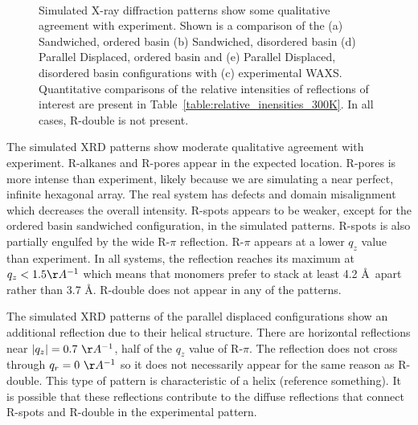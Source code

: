 \documentclass[journal=jpcbfk,manusciprt=article]{achemso}
\begin{document}
\begin{figure}[!htb]
\begin{subfigure}{0.1\textwidth}
	\end{subfigure}	
	\caption{Simulated X-ray diffraction patterns show some qualitative agreement with 
	experiment. Shown is a comparison of the (a) Sandwiched, ordered basin (b) Sandwiched,
	disordered basin (d) Parallel Displaced, ordered basin and (e) Parallel Displaced, disordered basin 
	configurations with (c) experimental WAXS. Quantitative comparisons of the relative 
	intensities of reflections of interest are present in Table~\ref{table:relative_inensities_300K}. 
	In all cases, R-double is not present.}~\label{fig:XRDsim} 
  \end{figure}
  
  The simulated XRD patterns show moderate qualitative agreement with experiment. R-alkanes and
  R-pores appear in the expected location. R-pores is more intense than experiment, likely
  because we are simulating a near perfect, infinite hexagonal array. The real system has 
  defects and domain misalignment which decreases the overall intensity.
  R-spots appears to be weaker, except for the ordered basin sandwiched configuration, in the 
  simulated patterns. R-spots is also partially engulfed by the wide R-$\pi$ reflection. R-$\pi$
  appears at a lower $q_z$ value than experiment. In all systems, the reflection reaches its 
  maximum at $q_z < 1.5 \AA^{-1}$ which means that monomers prefer to stack at least 4.2 \AA~apart
  rather than 3.7 \AA. R-double does not appear in any of the patterns. 
  
  
  The simulated XRD patterns of the parallel displaced configurations show an additional
  reflection due to their helical structure. There are horizontal reflections near $|q_z|= 
  0.7~\AA^{-1}$, half of the $q_z$ value of R-$\pi$. The reflection does not cross through
  $q_r = 0~\AA^{-1}$ so it does not necessarily appear for the same reason as R-double. 
  This type of pattern is characteristic of a helix (reference something).
  It is possible that these reflections contribute to the diffuse reflections that connect
  R-spots and R-double in the experimental pattern.
\end{document}
